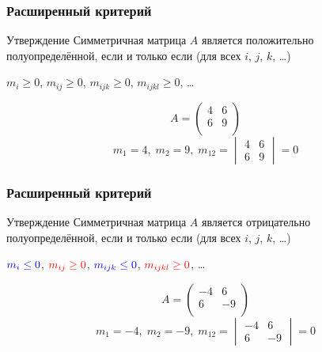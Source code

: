 \begin{frame}
    \frametitle{Расширенный критерий}

    \begin{block}{Утверждение}
        Симметричная матрица $A$ является положительно полуопределённой, если и только если (для всех $i$, $j$, $k$, \ldots)

        $m_i \geq 0$,  $m_{ij} \geq 0$, $m_{ijk} \geq 0$, $m_{ijkl} \geq 0$, \ldots \pause
    \end{block}
\[
A = \begin{pmatrix}
    4 & 6 \\
    6 & 9 \\ 
\end{pmatrix}
\]
\[
    m_1 = 4, \; m_2 = 9, \; m_{12} = \begin{vmatrix}
        4 & 6 \\
        6 & 9
    \end{vmatrix} = 0
\]
    
\end{frame}




\begin{frame}
    \frametitle{Расширенный критерий}

    \begin{block}{Утверждение}
        Симметричная матрица $A$ является отрицательно полуопределённой, если и только если (для всех $i$, $j$, $k$, \ldots)

        $\textcolor{blue}{m_i \leq 0}$,  $\textcolor{red}{m_{ij} \geq 0}$, $\textcolor{blue}{m_{ijk} \leq 0}$, $\textcolor{red}{m_{ijkl} \geq 0}$, \ldots \pause
    \end{block}
\[
A = \begin{pmatrix}
    -4 & 6 \\
    6 & -9 \\ 
\end{pmatrix}
\]
\[
    m_1 = -4, \; m_2 = -9, \; m_{12} = \begin{vmatrix}
        -4 & 6 \\
        6 & -9
    \end{vmatrix} = 0
\]
    
\end{frame}


